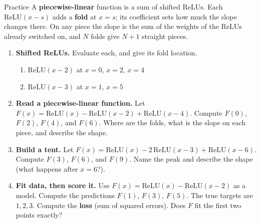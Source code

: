 \documentclass[10pt]{article}
\newcommand{\relu}{\mathrm{ReLU}}
\begin{document}
\namedateperiod

\vspace{0.12in}

\begin{notesbox}{Practice}
A \textbf{piecewise-linear} function is a sum of shifted ReLUs. Each $\relu(x-s)$ adds a \textbf{fold} at
$x=s$; its coefficient sets how much the slope changes there. On any piece the slope is the sum of the
weights of the ReLUs already switched on, and $N$ folds give $N+1$ straight pieces.

\begin{enumerate}[leftmargin=1.9em, itemsep=11pt]
  \item \textbf{Shifted ReLUs.} Evaluate each, and give its fold location.
    \begin{enumerate}[label=(\alph*), leftmargin=1.8em, itemsep=4pt]
      \item $\relu(x-2)$ at $x=0$, $x=2$, $x=4$ \hfill {}
      \item $\relu(x-3)$ at $x=1$, $x=5$ \hfill {}
    \end{enumerate}
  \item \textbf{Read a piecewise-linear function.} Let $F(x)=\relu(x)-\relu(x-2)+\relu(x-4)$. Compute
        $F(0)$, $F(2)$, $F(4)$, and $F(6)$. Where are the folds, what is the slope on each piece, and
        describe the shape.
  \item \textbf{Build a tent.} Let $F(x)=\relu(x)-2\,\relu(x-3)+\relu(x-6)$. Compute $F(3)$, $F(6)$, and
        $F(9)$. Name the peak and describe the shape (what happens after $x=6$?).
  \item \textbf{Fit data, then score it.} Use $F(x)=\relu(x)-\relu(x-2)$ as a model. Compute the
        predictions $F(1)$, $F(3)$, $F(5)$. The true targets are $1,2,3$. Compute the \textbf{loss} (sum of
        squared errors). Does $F$ fit the first two points exactly?

\end{enumerate}
\end{notesbox}
\end{document}
